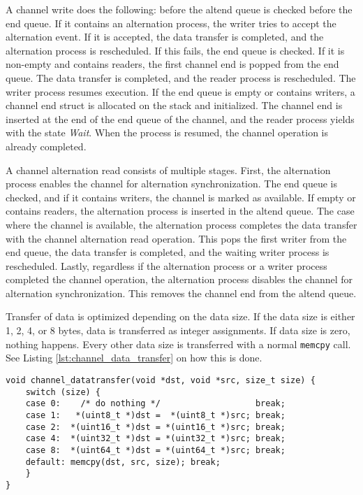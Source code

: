A channel write does the following: before the altend queue is checked before the end queue. If it contains an alternation process, the writer tries to accept the alternation event. If it is accepted, the data transfer is completed, and the alternation process is rescheduled. If this fails, the end queue is checked. If it is non\hyp{}empty and contains readers, the first channel end is popped from the end queue. The data transfer is completed, and the reader process is rescheduled. The writer process resumes execution. If the end queue is empty or contains writers, a channel end struct is allocated on the stack and initialized. The channel end is inserted at the end of the end queue of the channel, and the reader process yields with the state \textit{Wait}. When the process is resumed, the channel operation is already completed.

A channel alternation read consists of multiple stages. First, the alternation process enables the channel for alternation synchronization. The end queue is checked, and if it contains writers, the channel is marked as available. If empty or contains readers, the alternation process is inserted in the altend queue. The case where the channel is available, the alternation process completes the data transfer with the channel alternation read operation. This pops the first writer from the end queue, the data transfer is completed, and the waiting writer process is rescheduled. Lastly, regardless if the alternation process or a writer process completed the channel operation, the alternation process disables the channel for alternation synchronization. This removes the channel end from the altend queue. 

Transfer of data is optimized depending on the data size. If the data size is either 1, 2, 4, or 8 bytes, data is transferred as integer assignments. If data size is zero, nothing happens. Every other data size is transferred with a normal \texttt{memcpy} call. See Listing \ref{lst:channel_data_transfer} on how this is done.

\begin{lstlisting}[caption={Channel data transfer},style={CustomC},label={lst:channel_data_transfer}]
void channel_datatransfer(void *dst, void *src, size_t size) {
    switch (size) {
    case 0:    /* do nothing */                   break;
    case 1:   *(uint8_t *)dst =  *(uint8_t *)src; break;
    case 2:  *(uint16_t *)dst = *(uint16_t *)src; break;
    case 4:  *(uint32_t *)dst = *(uint32_t *)src; break;
    case 8:  *(uint64_t *)dst = *(uint64_t *)src; break;
    default: memcpy(dst, src, size); break;
    }
}
\end{lstlisting}

